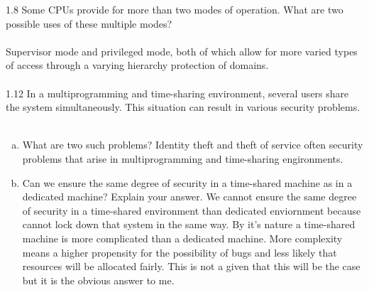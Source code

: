 \documentclass[12pt]{article}
\begin{document}
1.8 Some CPUs provide for more than two modes of operation. What are two
possible uses of these multiple modes?\\\\
Supervisor mode and privileged mode, both of which allow for more varied 
types of access through a varying hierarchy protection of domains.\\\\
1.12 In a multiprogramming and time-sharing environment, several users
share the system simultaneously. This situation can result in various
security problems.\\\\
\begin{enumerate}[a)]
    \item What are two such problems? Identity theft and theft of service 
    often security problems that arise in multiprogramming and time-sharing 
    engironments. 
    \item Can we ensure the same degree of security in a time-shared 
    machine as in a dedicated machine? Explain your answer. We cannot 
    ensure the same degree of security in a time-shared environment than 
    dedicated enviornment because cannot lock down that system in the same
    way. By it's nature a time-shared machine is more complicated than 
    a dedicated machine. More complexity means a higher propensity for 
    the possibility of bugs and less likely that resources will be allocated 
    fairly. This is not a given that this will be the case but it is the obvious 
    answer to me.
\end{enumerate}
\end{document}
